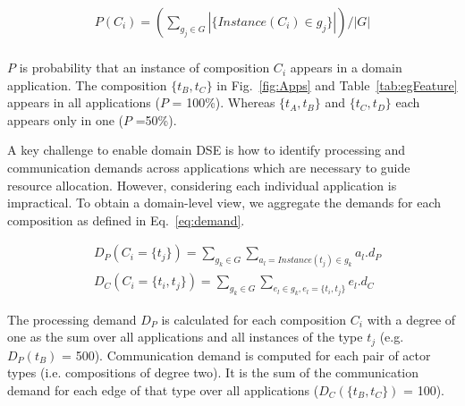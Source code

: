 \begin{equation}
\begin{split}
\label{eq:p}
P(C_i) = (\sum_{g_j \in G} \left\vert \{ Instance(C_i) \in g_j \} \right\vert) / \left\vert{G}\right\vert \\
\end{split}
\end{equation}


$P$ is probability that an instance of composition $C_i$ appears in a domain application. The composition $\{t_{B}, t_{C}\}$ in Fig.~\ref{fig:Apps} and Table~\ref{tab:egFeature} appears in all applications ($P$ = 100\%). Whereas $\{t_A, t_B\}$ and $\{t_C, t_D\}$ each appears only in one ($P$ =50\%).  

A key challenge to enable domain DSE is how to identify processing and communication demands across applications which are necessary to guide resource allocation. However, considering each individual application is impractical. To obtain a domain-level view, we aggregate the demands for each composition as defined in Eq.~\eqref{eq:demand}.

\begin{equation}
\begin{split}
\label{eq:demand}
	&D_P(C_i=\{t_j\}) = \sum_{g_k \in G} \sum_{ a_l = Instance(t_j) \in g_k} a_l.d_P\\
	&D_C(C_i=\{t_i, t_j\}) = \sum_{g_k \in G} \sum_{e_l \in g_k, e_l=\{t_i,t_j\}} e_l.d_C
\end{split}
\end{equation}


The processing demand $D_P$ is calculated for each composition $C_i$ with a degree of one as the sum over all applications and all instances of the type $t_j$ (e.g. $D_P(t_B)$ = 500). Communication demand is computed for each pair of actor types (i.e. compositions of degree two). It is the sum of the communication demand for each edge of that type over all applications ($D_C(\{t_B, t_C\})$ = 100). 

